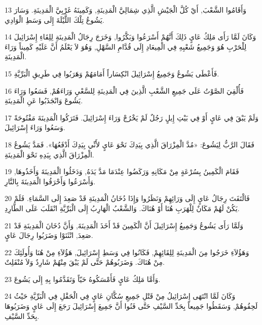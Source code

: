 \par 13 وَأَقَامُوا الشَّعْبَ, أَيْ كُلَّ الْجَيْشِ الَّذِي شِمَالِيَّ الْمَدِينَةِ, وَكَمِينَهُ غَرْبِيَّ الْمَدِينَةِ. وَسَارَ يَشُوعُ تِلْكَ اللَّيْلَةَ إِلَى وَسَطِ الْوَادِي.
\par 14 وَكَانَ لَمَّا رَأَى مَلِكُ عَايٍ ذَلِكَ أَنَّهُمْ أَسْرَعُوا وَبَكَّرُوا, وَخَرَجَ رِجَالُ الْمَدِينَةِ لِلِقَاءِ إِسْرَائِيلَ لِلْحَرْبِ هُوَ وَجَمِيعُ شَعْبِهِ فِي الْمِيعَادِ إِلَى قُدَّامِ السَّهْلِ, وَهُوَ لاَ يَعْلَمُ أَنَّ عَلَيْهِ كَمِيناً وَرَاءَ الْمَدِينَةِ.
\par 15 فَأَعْطَى يَشُوعُ وَجَمِيعُ إِسْرَائِيلَ انْكِسَاراً أَمَامَهُمْ وَهَرَبُوا فِي طَرِيقِ الْبَرِّيَّةِ.
\par 16 فَأُلْقِيَ الصَّوْتُ عَلَى جَمِيعِ الشَّعْبِ الَّذِينَ فِي الْمَدِينَةِ لِلسَّعْيِ وَرَاءَهُمْ, فَسَعُوا وَرَاءَ يَشُوعَ وَانْجَذَبُوا عَنِ الْمَدِينَةِ.
\par 17 وَلَمْ يَبْقَ فِي عَايٍ أَوْ فِي بَيْتِ إِيلٍ رَجُلٌ لَمْ يَخْرُجْ وَرَاءَ إِسْرَائِيلَ. فَتَرَكُوا الْمَدِينَةَ مَفْتُوحَةً وَسَعُوا وَرَاءَ إِسْرَائِيلَ.
\par 18 فَقَالَ الرَّبُّ لِيَشُوعَ: «مُدَّ الْمِزْرَاقَ الَّذِي بِيَدِكَ نَحْوَ عَايٍ لأَنِّي بِيَدِكَ أَدْفَعُهَا». فَمَدَّ يَشُوعُ الْمِزْرَاقَ الَّذِي بِيَدِهِ نَحْوَ الْمَدِينَةِ.
\par 19 فَقَامَ الْكَمِينُ بِسُرْعَةٍ مِنْ مَكَانِهِ وَرَكَضُوا عِنْدَمَا مَدَّ يَدَهُ, وَدَخَلُوا الْمَدِينَةَ وَأَخَذُوهَا, وَأَسْرَعُوا وَأَحْرَقُوا الْمَدِينَةَ بِالنَّارِ.
\par 20 فَالْتَفَتَ رِجَالُ عَايٍ إِلَى وَرَائِهِمْ وَنَظَرُوا وَإِذَا دُخَانُ الْمَدِينَةِ قَدْ صَعِدَ إِلَى السَّمَاءِ. فَلَمْ يَكُنْ لَهُمْ مَكَانٌ لِلْهَرَبِ هُنَا أَوْ هُنَاكَ. وَالشَّعْبُ الْهَارِبُ إِلَى الْبَرِّيَّةِ انْقَلَبَ عَلَى الطَّارِدِ.
\par 21 وَلَمَّا رَأَى يَشُوعُ وَجَمِيعُ إِسْرَائِيلَ أَنَّ الْكَمِينَ قَدْ أَخَذَ الْمَدِينَةَ, وَأَنَّ دُخَانَ الْمَدِينَةِ قَدْ صَعِدَ, انْثَنَوْا وَضَرَبُوا رِجَالَ عَايٍ.
\par 22 وَهَؤُلاَءِ خَرَجُوا مِنَ الْمَدِينَةِ لِلِقَائِهِمْ, فَكَانُوا فِي وَسَطِ إِسْرَائِيلَ, هَؤُلاَءِ مِنْ هُنَا وَأُولَئِكَ مِنْ هُنَاكَ. وَضَرَبُوهُمْ حَتَّى لَمْ يَبْقَ مِنْهُمْ شَارِدٌ وَلاَ مُنْفَلِتٌ.
\par 23 وَأَمَّا مَلِكُ عَايٍ فَأَمْسَكُوهُ حَيّاً وَتَقَدَّمُوا بِهِ إِلَى يَشُوعَ.
\par 24 وَكَانَ لَمَّا انْتَهَى إِسْرَائِيلُ مِنْ قَتْلِ جَمِيعِ سُكَّانِ عَايٍ فِي الْحَقْلِ فِي الْبَرِّيَّةِ حَيْثُ لَحِقُوهُمْ, وَسَقَطُوا جَمِيعاً بِحَدِّ السَّيْفِ حَتَّى فَنُوا أَنَّ جَمِيعَ إِسْرَائِيلَ رَجَعَ إِلَى عَايٍ وَضَرَبُوهَا بِحَدِّ السَّيْفِ.
